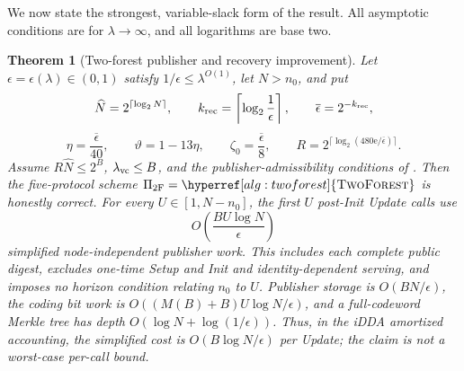 \documentclass[11pt]{article}
\newtheorem{theorem}{Theorem}[section]
\begin{document}
We now state the strongest, variable-slack form of the result.  All
asymptotic conditions are for $\lambda\to\infty$, and all logarithms are base
two.

\begin{theorem}[Two-forest publisher and recovery improvement]
\label{thm:main}
Let $\epsilon=\epsilon(\lambda)\in(0,1)$ satisfy
$1/\epsilon\le\lambda^{O(1)}$, let $N>n_0$, and put
\[
 \widehat N=2^{\lceil\log_2N\rceil},\qquad
 k_{\rm rec}=\left\lceil\log_2\frac1\epsilon\right\rceil,
 \qquad \overline\epsilon=2^{-k_{\rm rec}},
\]
\[
 \eta=\frac{\overline\epsilon}{40},\qquad
 \vartheta=1-13\eta,\qquad
 \zeta_0=\frac{\overline\epsilon}{8},\qquad
 R=2^{\lceil\log_2(480\mathrm e/\overline\epsilon)\rceil}.
\]
Assume $R\widehat N\le2^B$, $\lambda_{\rm vc}\le B$, and the
publisher-admissibility conditions of .  Then the
five-protocol scheme
$\Pi_{\rm 2F}=\hyperref[alg:twoforest]{\textsc{TwoForest}}$ is honestly correct.
For every $U\in[1,N-n_0]$, the first $U$ post-Init Update calls use
\[
 O\!\left(\frac{BU\log N}{\epsilon}\right)
\]
simplified node-independent publisher work.  This includes each complete
public digest, excludes one-time Setup and Init and identity-dependent serving,
and imposes no horizon condition relating $n_0$ to $U$.  Publisher storage is
$O(BN/\epsilon)$, the coding bit work is
$O((M(B)+B)U\log N/\epsilon)$, and a full-codeword Merkle tree has depth
$O(\log N+\log(1/\epsilon))$.  Thus, in the iDDA amortized accounting, the
simplified cost is $O(B\log N/\epsilon)$ per Update; the claim is not a
worst-case per-call bound.


\end{theorem}
\end{document}
